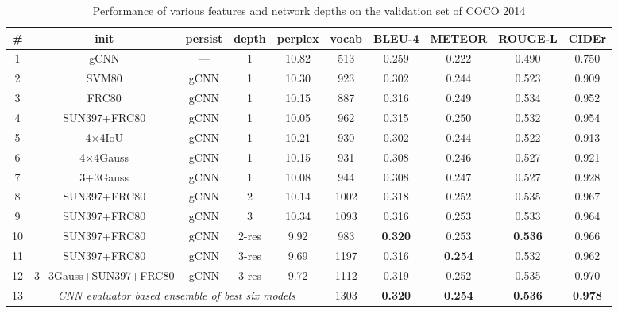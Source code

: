 \begin{table}[htp]
  \caption{Performance of various features and 
    network depths on the validation set of COCO 2014}
  \newcommand{\modpar}[4]{%
    \multirow{2}{*}{\emph{#1}} & \multirow{2}{*}{#2} & \multirow{2}{*}{#3}
    & \multirow{2}{*}{#4}}
  \centering
  \newcommand{\bs}{\small\bf}
  \begin{tabular}{||c|c|c|c|c|c|c|c|c|c|}
    \hline\hline
    \bf\# &\bf init &\bf persist &\bf depth &\bf perplex &\bf vocab &\bs BLEU-4 &\bs METEOR &\bs ROUGE-L &\bs CIDEr \\\hline\hline
    1 & gCNN                 &  --- & 1  & 10.82 & 513  & 0.259 & 0.222 & 0.490 & 0.750 \\
    2 & SVM80                & gCNN & 1  & 10.30 & 923  & 0.302 & 0.244 & 0.523 & 0.909 \\
    3 & FRC80                & gCNN & 1  & 10.15 & 887  & 0.316 & 0.249 & 0.534 & 0.952 \\
    4 & SUN397+FRC80         & gCNN & 1  & 10.05 & 962  & 0.315 & 0.250 & 0.532 & 0.954 \\\hline
    5 & 4$\times$4IoU        & gCNN & 1  & 10.21 & 930  & 0.302 & 0.244 & 0.522 & 0.913 \\
    6 & 4$\times$4Gauss      & gCNN & 1  & 10.15 & 931  & 0.308 & 0.246 & 0.527 & 0.921 \\
    7 & 3+3Gauss             & gCNN & 1  & 10.08 & 944  & 0.308 & 0.247 & 0.527 & 0.928 \\\hline
    8 & SUN397+FRC80         & gCNN & 2  & 10.14 & 1002 & 0.318 & 0.252 & 0.535 & 0.967 \\
    9 & SUN397+FRC80         & gCNN & 3  & 10.34 & 1093 & 0.316 & 0.253 & 0.533 & 0.964 \\
    10& SUN397+FRC80         & gCNN &2-res& 9.92 & 983  &\bf0.320& 0.253 &\bf0.536& 0.966 \\
    11& SUN397+FRC80         & gCNN &3-res& 9.69 & 1197 & 0.316 &\bf0.254& 0.532& 0.962 \\\hline
    12&3+3Gauss+SUN397+FRC80 & gCNN &3-res& 9.72 & 1112 & 0.319 & 0.252 & 0.535 & 0.970 \\\hline
    13& \multicolumn{4}{c|}{\em CNN evaluator based ensemble of best six models}    
                                                 & 1303 &\bf0.320&\bf0.254 &\bf0.536 &\bf0.978 \\\hline
    \hline
  \end{tabular}
  \label{tab:resultsVal}
\end{table}

